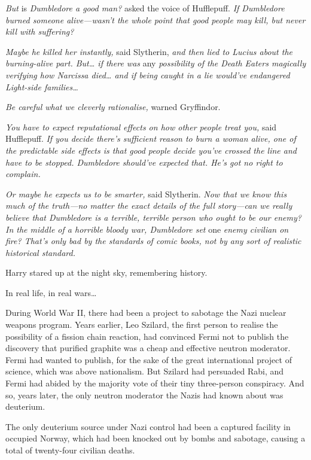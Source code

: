 \emph{But} is \emph{Dumbledore a good man?} asked the voice of
Hufflepuff. \emph{If Dumbledore burned someone alive---wasn't the whole
point that good people may kill, but never kill with suffering?}

\emph{Maybe he killed her instantly,} said Slytherin, \emph{and then
lied to Lucius about the burning-alive part. But\ldots{} if there was}
any \emph{possibility of the Death Eaters magically verifying how
Narcissa died\ldots{} and if being caught in a lie would've endangered
Light-side families\ldots{}}

\emph{Be careful what we cleverly rationalise,} warned Gryffindor.

\emph{You have to expect reputational effects on how other people treat
you,} said Hufflepuff. \emph{If you decide there's sufficient reason to
burn a woman alive, one of the predictable side effects is that good
people decide you've crossed the line and have to be stopped. Dumbledore
should've expected that. He's got no right to complain.}

\emph{Or maybe he expects us to be smarter,} said Slytherin. \emph{Now
that we know this much of the truth---no matter the exact details of the
full story---can we really believe that Dumbledore is a terrible,
terrible person who ought to be our enemy? In the middle of a horrible
bloody war, Dumbledore set} one \emph{enemy civilian on fire? That's
only bad by the standards of comic books, not by any sort of realistic
historical standard.}

Harry stared up at the night sky, remembering history.

In real life, in real wars\ldots{}

During World War II, there had been a project to sabotage the Nazi
nuclear weapons program. Years earlier, Leo Szilard, the first person to
realise the possibility of a fission chain reaction, had convinced Fermi
not to publish the discovery that purified graphite was a cheap and
effective neutron moderator. Fermi had wanted to publish, for the sake
of the great international project of science, which was above
nationalism. But Szilard had persuaded Rabi, and Fermi had abided by the
majority vote of their tiny three-person conspiracy. And so, years
later, the only neutron moderator the Nazis had known about was
deuterium.

The only deuterium source under Nazi control had been a captured
facility in occupied Norway, which had been knocked out by bombs and
sabotage, causing a total of twenty-four civilian deaths.

